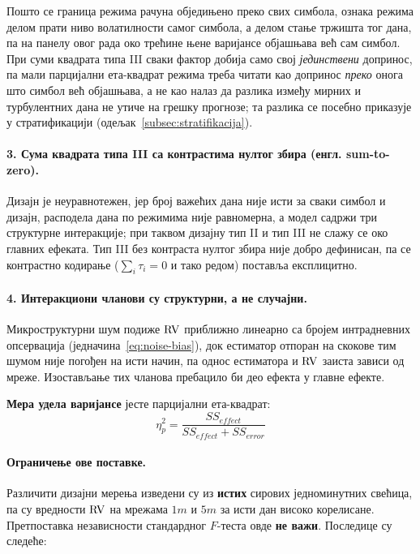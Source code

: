 Пошто се граница режима рачуна обједињено преко свих симбола, ознака режима делом прати
ниво волатилности самог симбола, а делом стање тржишта тог дана, па на панелу овог рада
око трећине њене варијансе објашњава већ сам симбол. При суми квадрата типа III сваки
фактор добија само свој \emph{јединствени} допринос, па мали парцијални ета-квадрат
режима треба читати као допринос \emph{преко} онога што симбол већ објашњава, а не као
налаз да разлика између мирних и турбулентних дана не утиче на грешку прогнозе; та
разлика се посебно приказује у стратификацији (одељак~\ref{subsec:stratifikacija}).

\paragraph{3. Сума квадрата типа III са контрастима нултог збира (енгл. sum-to-zero).}
Дизајн је неуравнотежен, јер број важећих дана није исти за сваки симбол и дизајн,
расподела дана по режимима није равномерна, а модел садржи три структурне интеракције;
при таквом дизајну тип II и тип III не слажу се око главних ефеката. Тип III без
контраста нултог збира није добро дефинисан, па се контрастно кодирање
($\sum_i\tau_i = 0$ и тако редом) поставља експлицитно.

\paragraph{4. Интеракциони чланови су структурни, а не случајни.}
Микроструктурни шум подиже $\mathrm{RV}$ приближно линеарно са бројем интрадневних опсервација
(једначина~\ref{eq:noise-bias}), док естиматор отпоран на скокове тим шумом није
погођен на исти начин, па однос естиматора и $\mathrm{RV}$ заиста зависи од мреже. Изостављање
тих чланова пребацило би део ефекта у главне ефекте.

\textbf{Мера удела варијансе} јесте парцијални ета-квадрат:
\begin{equation}
\eta_p^{2} = \frac{SS_{effect}}{SS_{effect} + SS_{error}}
\label{eq:eta}
\end{equation}

\paragraph{Ограничење ове поставке.}
Различити дизајни мерења изведени су из \textbf{истих} сирових једноминутних свећица,
па су вредности $\mathrm{RV}$ на мрежама $1m$ и $5m$ за исти дан високо корелисане.
Претпоставка независности стандардног $F$-теста овде \textbf{не важи}. Последице су
следеће:

